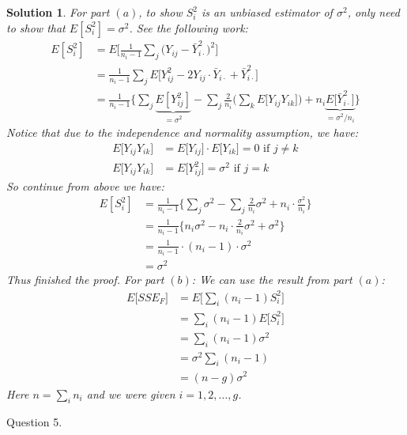 \documentclass[11pt]{article}
\newtheorem{sol}{Solution}
\begin{document}
\begin{sol}
	For part $(a)$, to show $S_i^2$ is an unbiased estimator of $\sigma^2$, only need to show that $E[S_i^2] = \sigma^2$. See the following work:
	\begin{align*}
		E[S_i^2]&= E\Big[\frac{1}{n_i- 1}\sum_j\Big(Y_{ij} - \bar{Y}^2_{i\cdot}\Big)^2\Big]\\
		&= \frac{1}{n_i - 1}\sum_j E\Big[Y_{ij}^2 - 2Y_{ij}\cdot \bar{Y}_{i\cdot} + \bar{Y}^2_{i\cdot}\Big]\\
		&= \frac{1}{n_i - 1}\Big\{\sum_j \underbrace{E[Y_{ij}^2]}_{ = \sigma^2} - \sum_j \frac{2}{n_i}\Big(\sum_k E\Big[Y_{ij}Y_{ik}\Big]\Big) + n_i \underbrace{E\Big[\bar{Y}^2_{i\cdot}\Big]}_{ = \sigma^2/n_i}\Big\}
	\end{align*}
	Notice that due to the independence and normality assumption, we have:
	\begin{align*}
		E\Big[Y_{ij}Y_{ik}\Big] &= E\Big[Y_{ij}\Big]\cdot E\Big[Y_{ik}\Big] = 0 \text{ if }j \neq k\\
		E\Big[Y_{ij}Y_{ik}\Big] & = E\Big[Y^2_{ij}\Big] = \sigma^2 \text{ if }j = k
 	\end{align*}
 	So continue from above we have:
 	\begin{align*}
 		E[S_i^2] &= \frac{1}{n_i - 1}\Big\{ \sum_j \sigma^2 - \sum_j\frac{2}{n_i}\sigma^2 + n_i \cdot \frac{\sigma^2}{n_i}\Big\}\\
 		&= \frac{1}{n_i - 1}\Big\{n_i\sigma^2 - n_i\cdot \frac{2}{n_i}\sigma^2 + \sigma^2\Big\}\\
 		&= \frac{1}{n_i - 1}\cdot (n_i - 1)\cdot \sigma^2\\
 		&= \sigma^2
 	\end{align*}
 	Thus finished the proof.\vskip 2mm
 	For part $(b)$:\vskip 2mm
 	We can use the result from part $(a)$:
 	\begin{align*}
 		E\Big[SSE_F\Big] &= E\Big[\sum_i(n_i - 1)S^2_i\Big]\\
 		&= \sum_i(n_i - 1)E\Big[S_i^2\Big]\\
 		&= \sum_i(n_i - 1)\sigma^2\\
 		&= \sigma^2\sum_i (n_i - 1)\\
 		&= (n - g)\sigma^2
 	\end{align*}
 	Here $n = \sum_i n_i$ and we were given $i = 1, 2, \ldots, g$.
\end{sol}
Question 5.
\end{document}
